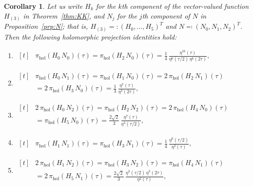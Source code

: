 \documentclass[11pt,reqno]{amsart}
\newtheorem{corollary}[theorem]{Corollary}
\newcommand{\holoproj}[1]{\pi_{\mathrm{hol}}\left(#1\right)}
\renewcommand{\=}{\;=\;}
\theoremstyle{myremark}
\begin{document}
\begin{corollary}
\label{cor:holoprojids}
Let us write $H_{k}$ for the $k$th component of the vector-valued function $H_{(3)}$ in Theorem~\ref{thm:KK}, and $N_j$ for the $j$th component of $N$ in Proposition~\ref{prp:N}; that is, $H_{(3)} =: (H_{0},\ldots,H_{5})^T$ and $N\eqqcolon (N_0, N_1, N_2)^T$.
Then the following holomorphic projection identities hold:\\[1pt]
\begin{enumerate}[label=\arabic*., itemsep=1em]
\renewcommand{\labelenumi}{\textup{\arabic{enumi}.}}
\item $\displaystyle
\begin{aligned}[t]
&
\holoproj{H_{0}\,N_0}(\tau)
=
\holoproj{H_{2}\,N_0}(\tau)
=
\frac{1}{4}\,
\frac{\eta^{16}(\tau)}
{\eta^6(\tau/2)\,\eta^6(2\tau)},
\end{aligned}
$

\item $\displaystyle
\begin{aligned}[t]
&
\pi_{\mathrm{hol}}\left(H_{0}\,N_1\right)(\tau)
=
\pi_{\mathrm{hol}}\left(H_{1}\,N_0\right)(\tau)
=
2\,\pi_{\mathrm{hol}}\left(H_{2}\,N_1\right)(\tau)\\
&=
2\,\pi_{\mathrm{hol}}\left(H_{3}\,N_0\right)(\tau)
=
\frac{1}{3}\,
\frac{\eta^7(\tau)}
{\eta^3(2\tau)},
\end{aligned}
$

\item $\displaystyle
\begin{aligned}[t]
&
2\,\pi_{\mathrm{hol}}\left(H_{0}\,N_2\right)(\tau)
=
\pi_{\mathrm{hol}}\left(H_{2}\,N_2\right)(\tau)
=
2\,\pi_{\mathrm{hol}}\left(H_{4}\,N_0\right)(\tau)\\
&=
\pi_{\mathrm{hol}}\left(H_{5}\,N_0\right)(\tau)
=
\frac{2\sqrt{2}}{3}\,
\frac{\eta^7(\tau)}
{\eta^3(\tau/2)},
\end{aligned}
$

\item $\displaystyle
\begin{aligned}[t]
&
\pi_{\mathrm{hol}}\left(H_{1}\,N_1\right)(\tau)
=
\pi_{\mathrm{hol}}\left(H_{3}\,N_1\right)(\tau)
=
\frac{1}{4}\,
\frac{\eta^6(\tau/2)}
{\eta^2(\tau)},
\end{aligned}
$

\item $\displaystyle
\begin{aligned}[t]
&
2\,\pi_{\mathrm{hol}}\left(H_{1}\,N_2\right)(\tau)
=
\pi_{\mathrm{hol}}\left(H_{3}\,N_2\right)(\tau)
=
\pi_{\mathrm{hol}}\left(H_{4}\,N_1\right)(\tau)\\
&=
2\,\pi_{\mathrm{hol}}\left(H_{5}\,N_1\right)(\tau)
=
\frac{2\sqrt{2}}{3}\,
\frac{\eta^3(\tau/2)\,\eta^3(2\tau)}
{\eta^2(\tau)},
\end{aligned}
$


\end{enumerate}
\end{corollary}
\end{document}
